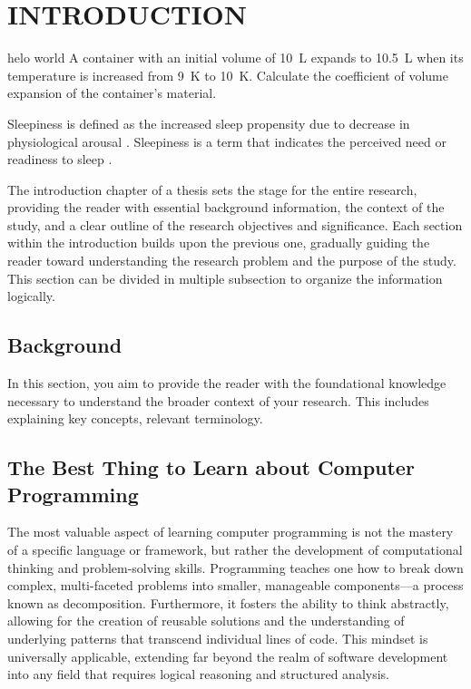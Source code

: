 \chapter{INTRODUCTION}
helo world 
A container with an initial volume of \SI{10}{\liter} expands to \SI{10.5}{\liter} when its temperature is increased from \SI{9}{\kelvin} to \SI{10}{\kelvin}. Calculate the coefficient of volume expansion of the container's material.

Sleepiness is defined as the increased sleep propensity due to decrease in physiological arousal \parencite{Lal_2005as, Vassalli2009}. 	Sleepiness is a term that indicates the perceived need or readiness to sleep  \parencite{Amso_2015}.

\par The introduction chapter of a thesis sets the stage for the entire research, providing the reader with essential background information, the context of the study, and a clear outline of the research objectives and significance. Each section within the introduction builds upon the previous one, gradually guiding the reader toward understanding the research problem and the purpose of the study. This section can be divided in multiple subsection to organize the information logically.

\section{Background}

In this section, you aim to provide the reader with the foundational knowledge necessary to understand the broader context of your research. This includes explaining key concepts, relevant terminology.

\section{The Best Thing to Learn about Computer Programming}

The most valuable aspect of learning computer programming is not the mastery of a specific language or framework, but rather the development of computational thinking and problem-solving skills. Programming teaches one how to break down complex, multi-faceted problems into smaller, manageable components—a process known as decomposition. Furthermore, it fosters the ability to think abstractly, allowing for the creation of reusable solutions and the understanding of underlying patterns that transcend individual lines of code. This mindset is universally applicable, extending far beyond the realm of software development into any field that requires logical reasoning and structured analysis.



